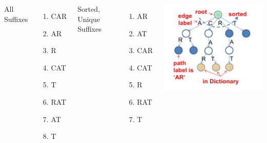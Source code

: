\documentclass{beamer}
\begin{document}
\begin{frame}
{    \begin{columns}[T]
      All Suffixes
      \begin{enumerate}
      \item CAR
      \item AR
      \item R
      \item CAT
      \item T
      \item RAT
      \item AT
      \item T
      \end{enumerate}
      Sorted, Unique Suffixes
      \begin{enumerate}
      \item AR
      \item AT
      \item CAR
      \item CAT
      \item R
      \item RAT
      \item T
      \end{enumerate}
      \includegraphics[width=.9\textwidth]{../img/suffixtrie_halim}\\
    \end{columns}
  }
\end{frame}
\end{document}
